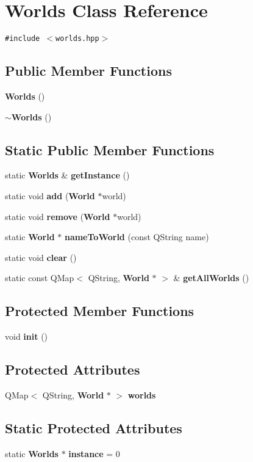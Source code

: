 \section{Worlds Class Reference}
\label{classWorlds}
{\tt \#include $<$worlds.hpp$>$}

\subsection*{Public Member Functions}
\begin{CompactItemize}
\item 
{\bf Worlds} ()
\item 
{\bf $\sim$Worlds} ()
\end{CompactItemize}
\subsection*{Static Public Member Functions}
\begin{CompactItemize}
\item 
static {\bf Worlds} \& {\bf get\-Instance} ()
\item 
static void {\bf add} ({\bf World} $\ast$world)
\item 
static void {\bf remove} ({\bf World} $\ast$world)
\item 
static {\bf World} $\ast$ {\bf name\-To\-World} (const QString name)
\item 
static void {\bf clear} ()
\item 
static const QMap$<$ QString, {\bf World} $\ast$ $>$ \& {\bf get\-All\-Worlds} ()
\end{CompactItemize}
\subsection*{Protected Member Functions}
\begin{CompactItemize}
\item 
void {\bf init} ()
\end{CompactItemize}
\subsection*{Protected Attributes}
\begin{CompactItemize}
\item 
QMap$<$ QString, {\bf World} $\ast$ $>$ {\bf worlds}
\end{CompactItemize}
\subsection*{Static Protected Attributes}
\begin{CompactItemize}
\item 
static {\bf Worlds} $\ast$ {\bf instance} = 0
\end{CompactItemize}



